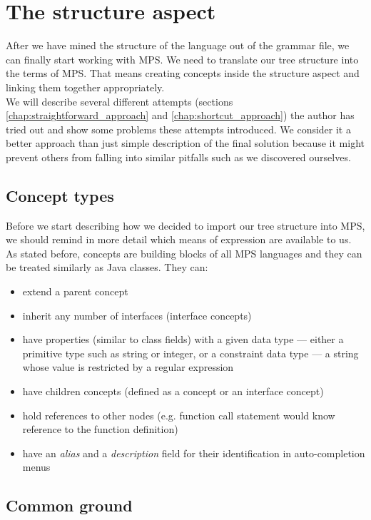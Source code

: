 \section{The structure aspect}

After we have mined the structure of the language out of the grammar file, we can finally start working with MPS.
We need to translate our tree structure into the terms of MPS.
That means creating concepts inside the structure aspect and linking them together appropriately.
\\

We will describe several different attempts (sections \ref{chap:straightforward_approach} and \ref{chap:shortcut_approach}) the author has tried out and show some problems these attempts introduced.
We consider it a better approach than just simple description of the final solution because it might prevent others from falling into similar pitfalls such as we discovered ourselves.


\subsection{Concept types}

Before we start describing how we decided to import our tree structure into MPS, we should remind in more detail which means of expression are available to us.
As stated before, concepts are building blocks of all MPS languages and they can be treated similarly as Java classes.
They can:

\begin{itemize}
	\item extend a parent concept
	\item inherit any number of interfaces (interface concepts)
	\item have properties (similar to class fields) with a given data type --- either a primitive type such as string or integer, or a constraint data type --- a string whose value is restricted by a regular expression
	\item have children concepts (defined as a concept or an interface concept)
	\item hold references to other nodes (e.g. function call statement would know reference to the function definition)
	\item have an \textit{alias} and a \textit{description} field for their identification in auto-completion menus
\end{itemize}

\subsection{Common ground}
\label{chap:common_ground}

